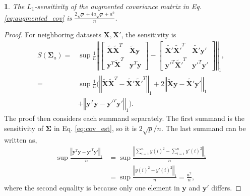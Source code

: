 \documentclass[USenglish,oneside,twocolumn]{article}
\theoremstyle{definition}
\theoremstyle{remark}
\theoremstyle{plain}
\theoremstyle{plain}
\newtheorem{lem}{\protect\lemmaname}
\providecommand{\lemmaname}{Lemma}
\begin{document}
\begin{lem}
\label{lem:sens_aug_cov}The $L_{1}$-sensitivity of the augmented
covariance matrix in Eq. \eqref{eq:augmented_cov} is $\frac{2\sqrt{p}+4a\sqrt{p}+a^{2}}{n}$.
\end{lem}
\begin{proof}
For neighboring datasets $\mathbf{X},\mathbf{X}'$, the sensitivity
is
\begin{align*}
S(\boldsymbol{\Sigma}_{a})= & \sup\frac{1}{n}\left\Vert \begin{bmatrix}\widetilde{\mathbf{X}}\widetilde{\mathbf{X}}^{T} & \widetilde{\mathbf{X}}\mathbf{y}\\
\mathbf{y}^{T}\widetilde{\mathbf{X}}^{T} & \mathbf{y}^{T}\mathbf{y}
\end{bmatrix}-\begin{bmatrix}\widetilde{\mathbf{X}'}\widetilde{\mathbf{X}'}^{T} & \widetilde{\mathbf{X}'}\mathbf{y}'\\
\mathbf{y}'^{T}\widetilde{\mathbf{X}'}^{T} & \mathbf{y}'^{T}\mathbf{y}'
\end{bmatrix}\right\Vert _{1},\\
= & \sup\frac{1}{n}(\left\Vert \widetilde{\mathbf{X}}\widetilde{\mathbf{X}}^{T}-\widetilde{\mathbf{X}'}\widetilde{\mathbf{X}'}^{T}\right\Vert _{1}+2\left\Vert \widetilde{\mathbf{X}}\mathbf{y}-\widetilde{\mathbf{X}'}\mathbf{y}'\right\Vert _{1}\\
 & +\left\Vert \mathbf{y}^{T}\mathbf{y}-\mathbf{y}'^{T}\mathbf{y}'\right\Vert _{1}).
\end{align*}
The proof then considers each summand separately. The first summand
is the sensitivity of $\boldsymbol{\Sigma}$ in Eq. \eqref{eq:cov_est},
so it is $2\sqrt{p}/n$. The last summand can be written as,
\begin{align*}
\sup\frac{\left\Vert \mathbf{y}^{T}\mathbf{y}-\mathbf{y}'^{T}\mathbf{y}'\right\Vert _{1}}{n} & =\sup\frac{\left\Vert \sum_{i=1}^{n}y(i)^{2}-\sum_{i=1}^{n}y'(i)^{2}\right\Vert _{1}}{n}\\
 & =\sup\frac{\left\Vert y(i)^{2}-y'(i)^{2}\right\Vert _{1}}{n}=\frac{a^{2}}{n},
\end{align*}
where the second equality is because only one element
in $\mathbf{y}$ and $\mathbf{y}'$ differs.


\end{proof}
\end{document}
